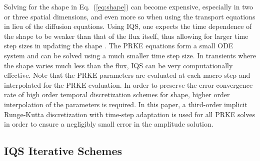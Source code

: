 \documentclass{elsarticle}
\newcommand{\eqt}[1]{Eq.~(\ref{#1})}                     %
\newcommand{\fig}[1]{Fig.~\ref{#1}}                      %
\begin{document}
Solving for the shape in \eqt{eq:shape} can become expensive, especially in two or three spatial dimensions, and even more so when using 
the transport equations in lieu of the diffusion equations.  Using IQS, one expects the time dependence of the shape to be weaker than that 
of the flux itself, thus allowing for larger time step sizes in updating the shape \cite{Ott_1966}. The PRKE equations form a small ODE system and can be 
solved using a much smaller time step size. In transients where the shape varies much less than the flux, IQS can be very computationally effective. 
%
Note that the PRKE parameters are evaluated at each macro step and interpolated for the PRKE evaluation. In order to preserve 
the error convergence rate of high order temporal discretization schemes for shape, higher order interpolation of the parameters is required. In this paper, a third-order implicit Runge-Kutta \cite{sdirk33} discretization with time-step adaptation is used for all PRKE solves in 
order to ensure a negligibly small error in the amplitude solution.

\subsection{IQS Iterative Schemes}
\label{sect:iter}
\end{document}
